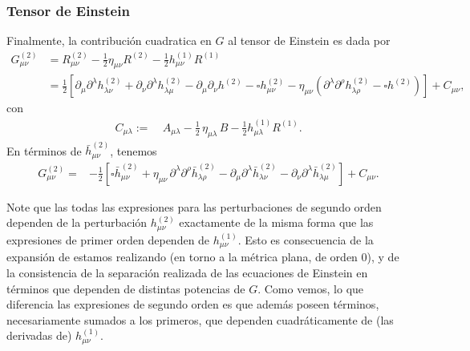 \subsubsection{Tensor de Einstein}
Finalmente, la contribución cuadratica en $G$ al tensor de Einstein es dada por
\begin{align}
G^{(2)}_{\mu\nu} & =  R^{(2)}_{\mu\nu}-\frac{1}{2}\eta_{\mu\nu}R^{(2)}-\frac{1}{2}h^{(1)}_{\mu\nu}R^{(1)}\\
& =  \frac{1}{2}\left[\partial_\mu\partial^\lambda h^{(2)}_{\lambda\nu}
+\partial_\nu\partial^\lambda h^{(2)}_{\lambda\mu} -
\partial_\mu\partial_\nu h^{(2)} -\square h^{(2)}_{\mu\nu}
-\eta_{\mu\nu}\left(\partial^\lambda \partial^\rho h^{(2)}_{\lambda\rho}
- \square h^{(2)}\right) \right]+C_{\mu\nu},
\end{align}
con
\begin{align}
C_{\mu\lambda} :=&\  A_{\mu\lambda}-\frac{1}{2}\,\eta_{\mu\lambda}\, B-\frac{1}{2}h^{(1)}_{\mu\lambda}R^{(1)}.
\end{align}
En términos de $\bar{h}^{(2)}_{\mu\nu}$, tenemos
\begin{align}
G^{(2)}_{\mu\nu} = & -\frac{1}{2}\left[\square \bar{h}^{(2)}_{\mu\nu}
+\eta_{\mu\nu}\, \partial^\lambda\partial^\rho\bar{h}^{(2)}_{\lambda\rho}-
\partial_\mu\partial^\lambda\bar{h}^{(2)}_{\lambda\nu}
- \partial_\nu\partial^\lambda \bar{h}^{(2)}_{\lambda\mu}\right]
+C_{\mu\nu}.
\end{align}

Note que las todas las expresiones para las perturbaciones de segundo orden dependen de la perturbación $h^{(2)}_{\mu\nu}$ exactamente de la misma forma que las expresiones de primer orden dependen de $h^{(1)}_{\mu\nu}$. Esto es consecuencia de la expansión de estamos realizando (en torno a la métrica plana, de orden 0), y de la consistencia de la separación realizada de las ecuaciones de Einstein en términos que dependen de distintas potencias de $G$. Como vemos, lo que diferencia las expresiones de segundo orden es que además poseen términos, necesariamente sumados a los primeros, que dependen cuadráticamente de (las derivadas de) $h^{(1)}_{\mu\nu}$.


